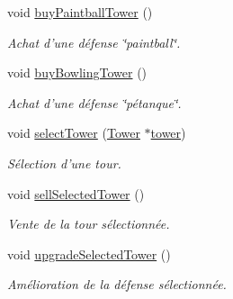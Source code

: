 \begin{DoxyCompactItemize}
void \hyperlink{classUI_a098f1fd7e42c754f82e6d68aba33cbd1}{buyPaintballTower} ()
\begin{DoxyCompactList}\small\item\em Achat d'une défense \char`\"{}paintball\char`\"{}. \end{DoxyCompactList}\item 
void \hyperlink{classUI_ad9cc9c903122ceca1d750555ec95dda7}{buyBowlingTower} ()
\begin{DoxyCompactList}\small\item\em Achat d'une défense \char`\"{}pétanque\char`\"{}. \end{DoxyCompactList}\item 
void \hyperlink{classUI_acc2450574743936721ad9d77b055d6d5}{selectTower} (\hyperlink{classTower}{Tower} $\ast$\hyperlink{classUI_a352f80a494c8d3c1723f1248438ea912}{tower})
\begin{DoxyCompactList}\small\item\em Sélection d'une tour. \end{DoxyCompactList}\item 
void \hyperlink{classUI_ad3666cc06e62117ba0ad65a1c3e6f1e5}{sellSelectedTower} ()
\begin{DoxyCompactList}\small\item\em Vente de la tour sélectionnée. \end{DoxyCompactList}\item 
void \hyperlink{classUI_a27f41a4f11f20308275dcb7638d25461}{upgradeSelectedTower} ()
\begin{DoxyCompactList}\small\item\em Amélioration de la défense sélectionnée. \end{DoxyCompactList}\end{DoxyCompactItemize}
